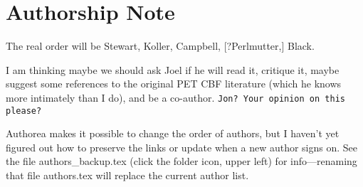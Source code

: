 \section*{Authorship Note}
The real order will be Stewart, Koller, Campbell, [?Perlmutter,] Black.

I am thinking maybe we should ask Joel if he will read it, critique it, maybe suggest some references to the original PET CBF literature (which he knows more intimately than I do), and be a co-author. 
\verb|Jon? Your opinion on this please?|

Authorea makes it possible to change the order of authors, but I haven't yet figured out how to preserve the links or update when a new author signs on. See the file authors\_backup.tex (click the folder icon, upper left) for info---renaming that file authors.tex will replace the current author list.
